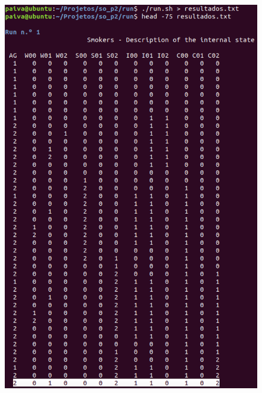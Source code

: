 \documentclass[10pt,portuguese]{article}
\begin{document}
\begin{figure}[!h]
    \centering
    \includegraphics[scale=0.5]{images/resultados/res1.png}
\end{figure}
\clearpage
\end{document}
